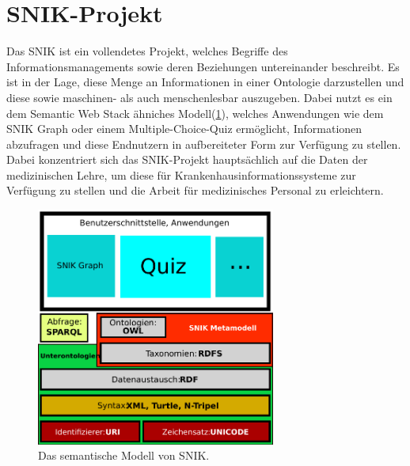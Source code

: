 \documentclass[headsepline,titlepage,ngerman,twoside,12pt]{report}
\begin{document}
\section{\acs{SNIK}-Projekt}
\label{sek:snik}
Das \ac{SNIK} ist ein vollendetes Projekt, welches Begriffe des Informationsmanagements sowie deren Beziehungen untereinander beschreibt.
Es ist in der Lage, diese Menge an Informationen in einer Ontologie darzustellen und diese sowie maschinen- als auch menschenlesbar auszugeben.
 Dabei nutzt es ein dem Semantic Web Stack ähniches Modell(\cref{img:semanticwebstack2}), welches Anwendungen wie dem \ac{SNIK} Graph oder einem Multiple-Choice-Quiz ermöglicht, Informationen abzufragen und diese Endnutzern in aufbereiteter Form zur Verfügung zu stellen.
Dabei konzentriert sich das SNIK-Projekt hauptsächlich auf die Daten der medizinischen Lehre, um diese für Krankenhausinformationssysteme zur Verfügung zu stellen und die Arbeit für medizinisches Personal zu erleichtern.
\begin{figure}
\centering
\includegraphics[width=0.7\textwidth]{images/swebstackde_snik.pdf}
\caption{Das semantische Modell von SNIK.}
\label{img:semanticwebstack2}
\end{figure}
\end{document}
